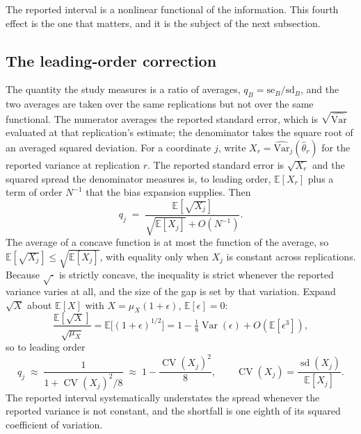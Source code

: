 The reported interval is a nonlinear functional of the information. This fourth
effect is the one that matters, and it is the subject of the next subsection.

\subsection{The leading-order correction}

The quantity the study measures is a ratio of averages, $q_B = \text{se}_B /
\text{sd}_B$, and the two averages are taken over the same replications but not
over the same functional. The numerator averages the reported standard error,
which is $\sqrt{\widehat{\text{Var}}}$ evaluated at that replication's estimate;
the denominator takes the square root of an averaged squared deviation. For a
coordinate $j$, write $X_r = \widehat{\text{Var}}_j(\hat\theta_r)$ for the reported
variance at replication $r$. The reported standard error is $\sqrt{X_r}$ and the
squared spread the denominator measures is, to leading order,
$\mathbb{E}[X_r]$ plus a term of order $N^{-1}$ that the bias expansion supplies.
Then
\begin{equation}
q_j \;=\; \frac{\mathbb{E}[\sqrt{X_j}]}{\sqrt{\mathbb{E}[X_j]} + O(N^{-1})}.
\label{eq:qjensen}
\end{equation}
The average of a concave function is at most the function of the average, so
$\mathbb{E}[\sqrt{X_j}] \le \sqrt{\mathbb{E}[X_j]}$, with equality only when $X_j$
is constant across replications. Because $\sqrt{\cdot}$ is strictly concave, the
inequality is strict whenever the reported variance varies at all, and the size of
the gap is set by that variation. Expand $\sqrt{X}$ about $\mathbb{E}[X]$ with
$X = \mu_X(1 + \epsilon)$, $\mathbb{E}[\epsilon] = 0$:
\begin{equation}
\frac{\mathbb{E}[\sqrt{X}]}{\sqrt{\mu_X}}
= \mathbb{E}\big[(1 + \epsilon)^{1/2}\big]
= 1 - \tfrac{1}{8}\operatorname{Var}(\epsilon) + O(\mathbb{E}[\epsilon^3]),
\label{eq:jensen}
\end{equation}
so to leading order
\begin{equation}
q_j \;\approx\; \frac{1}{1 + \operatorname{CV}(X_j)^2/8}
\;\approx\; 1 - \frac{\operatorname{CV}(X_j)^2}{8},
\qquad \operatorname{CV}(X_j) = \frac{\operatorname{sd}(X_j)}{\mathbb{E}[X_j]}.
\label{eq:qvarcv}
\end{equation}
The reported interval systematically understates the spread whenever the reported
variance is not constant, and the shortfall is one eighth of its squared
coefficient of variation.

